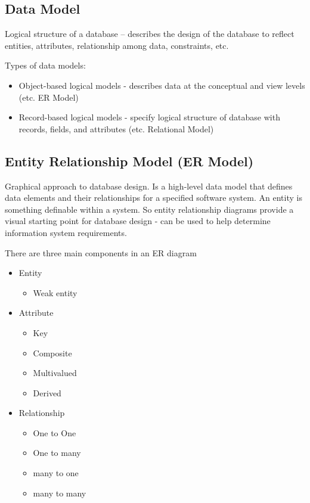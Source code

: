 \documentclass{article}
\begin{document}
    \subsection*{Data Model}

    Logical structure of a database -- describes the design of the database to 
    reflect entities, attributes, relationship among data, constraints, etc. 

    Types of data models:
    \begin{itemize}
        \item Object-based logical models - describes data at the conceptual 
        and view levels (etc. ER Model)
        \item Record-based logical models - specify logical structure of database 
        with records, fields, and attributes (etc. Relational Model)
    \end{itemize}
    
    \subsection*{Entity Relationship Model (ER Model)}

    Graphical approach to database design. Is a high-level data model that defines data 
    elements and their relationships for a specified software system. An entity is 
    something definable within a system. So entity relationship diagrams
    provide a visual starting point for database design - 
    can be used to help determine information system requirements.

    There are three main components in an ER diagram 
    \begin{itemize}
        \item Entity
        \begin{itemize}
            \item Weak entity
        \end{itemize}
        \item Attribute 
        \begin{itemize}
            \item Key 
            \item Composite 
            \item Multivalued 
            \item Derived
        \end{itemize}
        \item Relationship
        \begin{itemize}
            \item One to One
            \item One to many
            \item many to one 
            \item many to many
        \end{itemize}
    \end{itemize}
\end{document}
